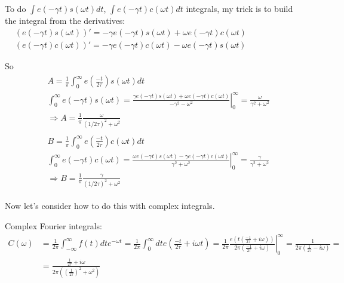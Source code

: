\documentclass[twoside,10pt]{amsart}
\begin{document}
To do $\int e\left( -\gamma t \right) s(\omega t) dt$, $\int e\left( -\gamma t \right) c(\omega t) dt$ integrals, my trick is to build the integral from the derivatives: \\
$\begin{aligned}
  & (e(-\gamma t) s(\omega t))' = -\gamma e(-\gamma t) s(\omega t) + \omega e(-\gamma t)c(\omega t) \\
  & (e(-\gamma t) c(\omega t))' = -\gamma e(-\gamma t) c(\omega t) - \omega e(-\gamma t)s(\omega t)
\end{aligned}$ 

So 
\[
\begin{aligned}
  & \begin{gathered}
  A = \frac{1}{\pi} \int_0^{\infty} e\left( \frac{-t}{2\tau} \right) s(\omega t) dt \\
  \int_0^{\infty} e(-\gamma t) s(\omega t) = \left. \frac{ \gamma e(-\gamma t) s(\omega t) + \omega e(-\gamma t) c(\omega t) }{ -\gamma^2 - \omega^2} \right|_0^{\infty} = \frac{\omega}{ \gamma^2 + \omega^2 } \\
  \Longrightarrow \boxed{ A = \frac{1}{\pi} \frac{ \omega }{ (1/2\tau)^2 + \omega^2 }  }
\end{gathered} \\
  & \begin{gathered}
  B = \frac{1}{\pi} \int_0^{\infty} e\left( \frac{-t}{2\tau} \right) c(\omega t) dt \\
  \int_0^{\infty} e(-\gamma t) c(\omega t) = \left. \frac{ \omega e(-\gamma t) s(\omega t) - \gamma e(-\gamma t) c(\omega t) }{ \gamma^2 + \omega^2} \right|_0^{\infty} = \frac{\gamma}{ \gamma^2 + \omega^2 } \\
  \Longrightarrow \boxed{ B = \frac{1}{\pi} \frac{ \gamma }{ (1/2\tau)^2 + \omega^2 }  }
\end{gathered} 
\end{aligned}
\]

Now let's consider how to do this with complex integrals.  

Complex Fourier integrals:  \\
\[
\begin{aligned}
  C(\omega) & = \frac{1}{2\pi} \int_{-\infty}^{\infty} f(t) dt e^{-\omega t} = \frac{1}{2\pi} \int_0^{\infty} dt e\left( \frac{-t}{2\tau} + i \omega t \right) = \frac{1}{2\pi} \left. \frac{ e\left( t \left( \frac{-1}{2\tau} + i \omega \right) \right) }{ 2\pi \left( \frac{-1}{2\tau} + i \omega \right) } \right|_0^{\infty} = \frac{1}{ 2\pi \left( \frac{1}{2\tau} - i \omega \right) } = \\
  & = \frac{ \frac{1}{2\tau} + i \omega }{ 2\pi \left( \left( \frac{1}{2\tau}\right)^2 + \omega^2 \right) }
\end{aligned}
\]
\end{document}
